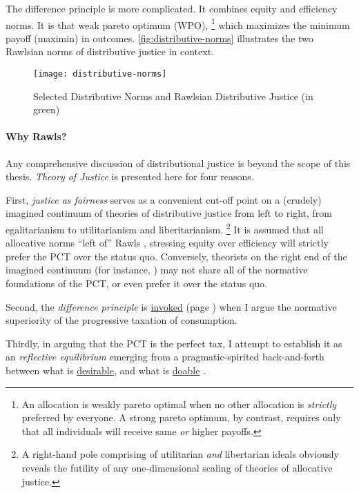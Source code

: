 The difference principle is more complicated.
It combines equity and efficiency norms.
It is that weak pareto optimum (WPO),
\footnote{
	An allocation is weakly pareto optimal when no other allocation is \emph{strictly} preferred by everyone.
A strong pareto optimum, by contrast, requires only that all individuals will receive same \emph{or} higher payoffs.
}
which maximizes the minimum payoff (maximin) in outcomes.
\autoref{fig:distributive-norms} illustrates the two Rawlsian norms of distributive justice in context.

\begin{figure}[htbp]
	\centering
	\texttt{[image: distributive-norms]}
	\caption[Selected Distributive Norms]{Selected Distributive Norms and Rawlsian Distributive Justice (in green)}
	\label{fig:distributive-norms}
\end{figure}

\paragraph{Why Rawls?}
Any comprehensive discussion of distributional justice is beyond the scope of this thesis.
\citeauthor{Rawls-1971} \emph{Theory of Justice} is presented here for four reasons.

First, \emph{justice as fairness} serves as a convenient cut-off point on a (crudely) imagined continuum of theories of distributive justice from left to right, from egalitarianism to utilitarianism and liberitarianism.
\footnote{
	A right-hand pole comprising of utilitarian \emph{and} libertarian ideals obviously reveals the futility of any one-dimensional scaling of theories of allocative justice.
}
It is assumed that all allocative norms ``left of'' Rawls \citep[such as][]{Cohen2000}, stressing equity over efficiency will strictly prefer the PCT over the status quo.
Conversely, theorists on the right end of the imagined continuum (for instance, \citealt{Nozick1974}) may not share all of the normative foundations of the PCT, or even prefer it over the status quo.

Second, the \emph{difference principle} is \hyperref[sec:FoundationalBeauty]{invoked} (page \pageref{sec:FoundationalBeauty}) when I argue the normative superiority of the progressive taxation of consumption.

Thirdly, in arguing that the PCT is the perfect tax, I attempt to establish it as an \emph{reflective equilibrium} \citep[49]{Rawls-1971} emerging from a pragmatic-spirited back-and-forth between what is \hyperref[sec:desirability]{desirable}, and what is \hyperref[sec:feasibility]{doable} \citealt[856]{McCaffery2005}.

